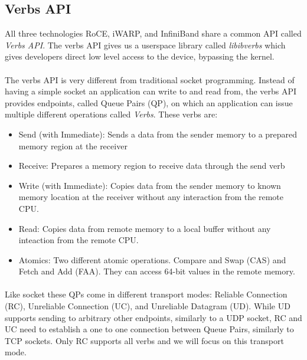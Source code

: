 \subsection{Verbs API}

All three technologies RoCE, iWARP, and InfiniBand share a common API called \emph{Verbs API}. The verbs API gives us a
userspace library called \emph{libibverbs} which gives developers direct low level access to the device, bypassing the kernel.

\paragraph{} The verbs API is very different from traditional socket programming. Instead of having a simple socket an 
application can write to and read from, the verbs API provides endpoints, called Queue Pairs (QP), on which an application 
can issue multiple different operations called \emph{Verbs}. These verbs are:

\begin{itemize}
  \item Send (with Immediate): Sends a data from the sender memory to a prepared memory region at the receiver
  \item Receive: Prepares a memory region to receive data through the send verb
  \item Write (with Immediate): Copies data from the sender memory to known memory location at the receiver without any 
    interaction from the remote CPU.
  \item Read: Copies data from remote memory to a local buffer without any inteaction from the remote CPU.
  \item Atomics: Two different atomic operations. Compare and Swap (CAS) and Fetch and Add (FAA). They can access 64-bit 
    values in the remote memory. 
\end{itemize}

\paragraph{} Like socket these QPs come in different transport modes: Reliable Connection (RC), Unreliable Connection (UC),
and Unreliable Datagram (UD). While UD supports sending to arbitrary other endpoints, similarly to a UDP socket, RC and UC 
need to establish a one to one connection between Queue Pairs, similarly to TCP sockets. Only RC supports all 
verbs and we will focus on this transport mode.


